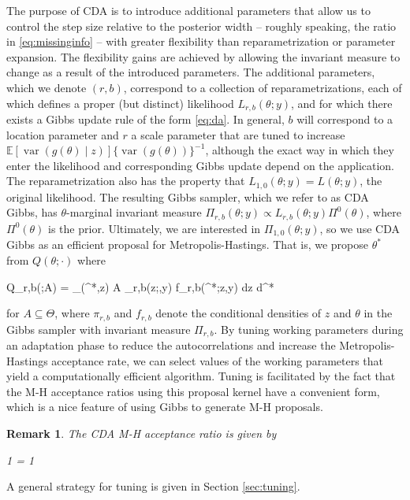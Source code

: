 \documentclass[12pt]{article}
\newtheorem{remark}{Remark}
\newcommand{\be}{\begin{equs}}
\newcommand{\ee}{\end{equs}}
\newcommand{\bb}[1]{\mathbb{#1}}
\newcommand{\mc}[1]{\mathcal{#1}}
\DeclareMathOperator{\var}{var}
\begin{document}
The purpose of CDA is to introduce additional parameters that allow us to control the step size relative to the posterior width -- roughly speaking, the ratio in \eqref{eq:missinginfo} -- with greater flexibility than reparametrization or parameter expansion. The flexibility gains are achieved by allowing the invariant measure to change as a result of the introduced parameters. The additional parameters, which we denote $(r,b)$, correspond to a collection of reparametrizations, each of which defines a proper (but distinct) likelihood $L_{r,b}(\theta;y)$, and for which there exists a Gibbs update rule of the form \eqref{eq:da}. In general, $b$ will correspond to a location parameter and $r$ a scale parameter that are tuned to increase $\bb E[\var(g(\theta) \mid z)]\{\var(g(\theta))\}^{-1}$, although the exact way in which they enter the likelihood and corresponding Gibbs update depend on the application. The reparametrization also has the property that $L_{1,0}(\theta;y) = L(\theta;y)$, the original likelihood. The resulting Gibbs sampler, which we refer to as CDA Gibbs, has $\theta$-marginal invariant measure $\Pi_{r,b}(\theta;y) \propto L_{r,b}(\theta;y) \Pi^0(\theta)$, where $\Pi^0(\theta)$ is the prior. Ultimately, we are interested in $\Pi_{1,0}(\theta;y)$, so we use CDA Gibbs as an efficient proposal for Metropolis-Hastings. That is, we propose $\theta^*$ from $Q(\theta;\cdot)$ where
\be \label{eq:Q}
Q_{r,b}(\theta;A) = \int_{(\theta^*,z) \in A \times \mc Z} \pi_{r,b}(z;\theta,y) f_{r,b}(\theta^*;z,y) dz d\theta^*
\ee
for $A \subseteq \Theta$, where $\pi_{r,b}$ and $f_{r,b}$ denote the conditional densities of $z$ and $\theta$ in the Gibbs sampler with invariant measure $\Pi_{r,b}$. By tuning working parameters during an adaptation phase to reduce the autocorrelations and increase the Metropolis-Hastings acceptance rate, we can select values of the working parameters that yield a computationally efficient algorithm. Tuning is facilitated by the fact that the M-H acceptance ratios using this proposal kernel have a convenient form, which is a nice feature of using Gibbs to generate M-H proposals.
\begin{remark} \label{rem:accrat}
The CDA M-H acceptance ratio is given by
\be
1 \wedge {} = 1 \wedge {} \label{eq:mh-accrat}
\ee
\end{remark}
A general strategy for tuning is given in Section \ref{sec:tuning}. 
\end{document}
